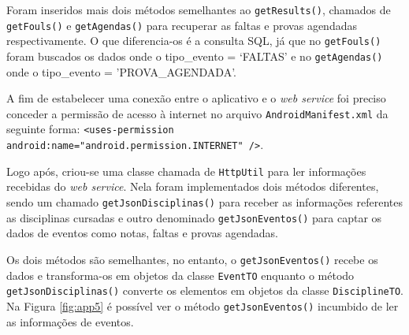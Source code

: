 	\pagebreak
	
	\par Foram inseridos mais dois métodos semelhantes ao \texttt{getResults()},
chamados de \\\texttt{getFouls()} e \texttt{getAgendas()} para recuperar as
faltas e provas agendadas respectivamente. O que diferencia-os é a consulta
SQL, já que no \texttt{getFouls()} foram buscados os dados onde o tipo\_evento
= ‘FALTAS' e no \texttt{getAgendas()} onde o tipo\_evento = 'PROVA\_AGENDADA'.

	\par A fim de estabelecer uma conexão entre o aplicativo e o \textit{web
service} foi preciso conceder a permissão de acesso à internet no arquivo
\texttt{AndroidManifest.xml} da seguinte forma: \texttt{<uses-permission
android:name="android.permission.INTERNET" />}.

	\par Logo após, criou-se uma classe chamada de \texttt{HttpUtil} para ler
informações recebidas do \textit{web service}. Nela foram implementados dois
métodos diferentes, sendo um chamado \texttt{getJsonDisciplinas()} para receber
as informações referentes as disciplinas cursadas e outro denominado
\texttt{getJsonEventos()} para captar os dados de eventos como notas, faltas e
provas agendadas.

	\par Os dois métodos são semelhantes, no entanto, o \texttt{getJsonEventos()}
recebe os dados e transforma-os em objetos da classe \texttt{EventTO} enquanto
o método \texttt{getJsonDisciplinas()} converte os elementos em objetos da
classe \texttt{DisciplineTO}. Na Figura \ref{fig:app5} é possível ver o método
\texttt{getJsonEventos()} incumbido de ler as informações de eventos.

